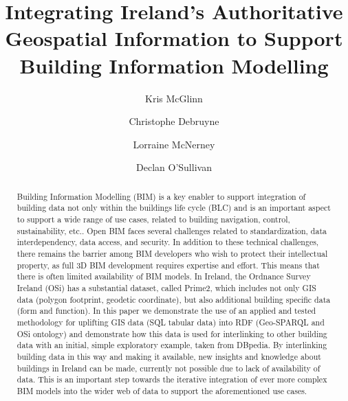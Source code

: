 \documentclass[runningheads,a4paper]{llncs}
\begin{document}
\mainmatter

\title{Integrating Ireland's Authoritative Geospatial Information to Support Building Information Modelling}
\author{Kris McGlinn \and
Christophe Debruyne \and
Lorraine McNerney \and
Declan O'Sullivan}
\maketitle

\begin{abstract}
Building Information Modelling (BIM) is a key enabler to support integration of building data not only within the buildings life cycle (BLC) and is an important aspect to support a wide range of use cases, related to building navigation, control, sustainability, etc.. Open BIM faces several challenges related to standardization, data interdependency, data access, and security. In addition to these technical challenges, there remains the barrier among BIM developers who wish to protect their intellectual property, as full 3D BIM development requires expertise and effort. This means that there is often limited availability of BIM models. In Ireland, the Ordnance Survey Ireland (OSi) has a substantial dataset, called Prime2, which includes not only GIS data (polygon footprint, geodetic coordinate), but also additional building specific data (form and function). In this paper we demonstrate the use of an applied and tested methodology for uplifting GIS data (SQL tabular data) into RDF (Geo-SPARQL and OSi ontology) and demonstrate how this data is used for interlinking to other building data with an initial, simple exploratory example, taken from DBpedia. By interlinking building data in this way and making it available, new insights and knowledge about buildings in Ireland can be made, currently not possible due to lack of availability of data. This is an important step towards the iterative integration of ever more complex BIM models into the wider web of data to support the aforementioned use cases.

\end{abstract}
\end{document}
